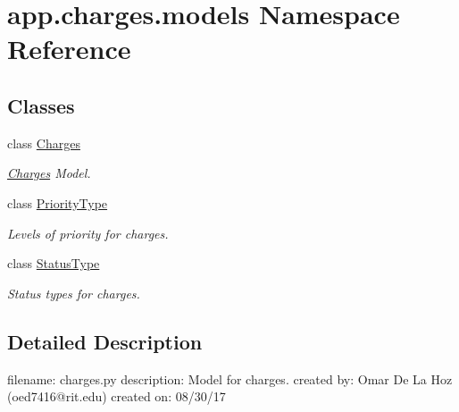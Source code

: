 \hypertarget{namespaceapp_1_1charges_1_1models}{}\section{app.\+charges.\+models Namespace Reference}
\label{namespaceapp_1_1charges_1_1models}
\subsection*{Classes}
\begin{DoxyCompactItemize}
\item 
class \mbox{\hyperlink{classapp_1_1charges_1_1models_1_1_charges}{Charges}}
\begin{DoxyCompactList}\small\item\em \mbox{\hyperlink{classapp_1_1charges_1_1models_1_1_charges}{Charges}} Model. \end{DoxyCompactList}\item 
class \mbox{\hyperlink{classapp_1_1charges_1_1models_1_1_priority_type}{Priority\+Type}}
\begin{DoxyCompactList}\small\item\em Levels of priority for charges. \end{DoxyCompactList}\item 
class \mbox{\hyperlink{classapp_1_1charges_1_1models_1_1_status_type}{Status\+Type}}
\begin{DoxyCompactList}\small\item\em Status types for charges. \end{DoxyCompactList}\end{DoxyCompactItemize}


\subsection{Detailed Description}
\begin{DoxyVerb}filename: charges.py
description: Model for charges.
created by: Omar De La Hoz (oed7416@rit.edu)
created on: 08/30/17
\end{DoxyVerb}
 